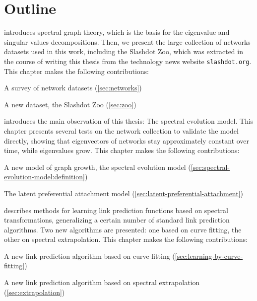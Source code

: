 \documentclass[11pt,a4paper]{book}
\newenvironment{itemize*}%
  {\begin{itemize}%
    \setlength{\itemsep}{0pt}%
    \setlength{\parskip}{0pt}}%
  {\end{itemize}}
\begin{document}
\section{Outline}
\begin{description}[leftmargin=2.15cm]
\item[Chapter~\ref{chap:preliminaries}] introduces spectral graph
theory, which is the basis for the eigenvalue and singular values
decompositions. Then, we
present the large collection of networks datasets used in this work,
including the Slashdot Zoo, which was extracted in the course of
writing this thesis from the technology news website
\texttt{slashdot.org}. 
This chapter makes the following
contributions:
\begin{itemize*}
\item A survey of network datasets (\ref{sec:networks}) 
\item A new dataset, the Slashdot Zoo (\ref{sec:zoo}) 
\end{itemize*}

\item[Chapter~\ref{chap:spectral-evolution-model}] introduces 
the main observation of this thesis:  The spectral evolution model.
This chapter presents several tests on the network collection to
validate the model directly, showing that eigenvectors of networks stay
approximately constant over time, while eigenvalues grow. 
This chapter makes the following
contributions:
\begin{itemize*}
\item A new model of graph growth, the spectral evolution model
  (\ref{sec:spectral-evolution-model:definition}) 
\item The latent preferential attachment model
  (\ref{sec:latent-preferential-attachment}) 
\end{itemize*}

\item[Chapter~\ref{chap:learning}] describes methods for
learning link prediction functions based on spectral transformations,
generalizing a certain number of standard link prediction algorithms. 
Two new algorithms are presented:  one based on curve fitting, the other
on spectral extrapolation. 
This chapter makes the following
contributions: 
\begin{itemize*}
\item A new link prediction algorithm based on curve fitting
  (\ref{sec:learning-by-curve-fitting}) 
\item A new link prediction algorithm based on spectral extrapolation
  (\ref{sec:extrapolation}) 
\end{itemize*}


\end{description}
\end{document}
